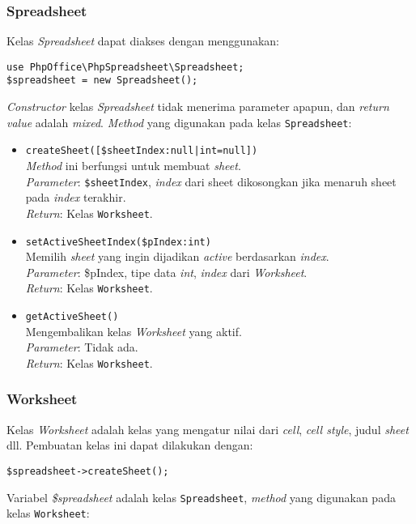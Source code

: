 \subsubsection{Spreadsheet}
	Kelas \textit{Spreadsheet} dapat diakses dengan menggunakan: 
	\begin{lstlisting}
use PhpOffice\PhpSpreadsheet\Spreadsheet;
$spreadsheet = new Spreadsheet();
	\end{lstlisting} 
	\textit{Constructor} kelas \textit{Spreadsheet} tidak menerima parameter apapun, dan \textit{return value} adalah \textit{mixed}. \textit{Method} yang digunakan pada kelas \texttt{Spreadsheet}:  
 \begin{itemize}
 	\item \texttt{createSheet([\$sheetIndex:null|int=null])} \\ 
 	\textit{Method} ini berfungsi untuk membuat \textit{sheet}.\\
 	\textit{Parameter}: \texttt{\$sheetIndex}, \textit{index} dari sheet dikosongkan jika menaruh sheet pada \textit{index} terakhir. \\ 
 	\textit{Return}: Kelas \texttt{Worksheet}.
 	
 	\item \texttt{setActiveSheetIndex(\$pIndex:int)}\\ Memilih \textit{sheet} yang ingin dijadikan \textit{active} berdasarkan \textit{index}. \\
 	\textit{Parameter}: \$pIndex, tipe data \textit{int}, \textit{index} dari \textit{Worksheet}. \\
 	\textit{Return}: Kelas \texttt{Worksheet}.
 	
 	\item \texttt{getActiveSheet()}\\
 	 Mengembalikan kelas \textit{Worksheet} yang aktif.\\
 	\textit{Parameter}: Tidak ada. \\ 
 	\textit{Return}: Kelas \texttt{Worksheet}.
 \end{itemize}

\subsubsection{Worksheet}
Kelas \textit{Worksheet} adalah kelas yang mengatur nilai dari \textit{cell}, \textit{cell style}, judul \textit{sheet} dll. Pembuatan kelas ini dapat dilakukan dengan:
\begin{lstlisting}
$spreadsheet->createSheet();
\end{lstlisting}
Variabel \textit{\$spreadsheet} adalah kelas \texttt{Spreadsheet}, \textit{method} yang digunakan pada kelas \texttt{Worksheet}:

